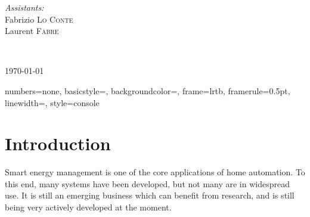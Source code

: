 \begin{titlepage}
\begin{center}
\begin{minipage}{0.4\textwidth}
\begin{flushright}
        \emph{Assistants:} \\
        Fabrizio \textsc{Lo Conte}\\
        Laurent \textsc{Fabre}\\[0.5cm]
      \end{flushright}
    \end{minipage} \\[2cm]
     
    \vfill
     
    {\large \today}
     
  \end{center}

\end{titlepage}

\newpage{}

\fancyfoot{}
\lhead{}
\cfoot{\thepage}        %
\rfoot{\today} %



\tableofcontents{}

\newpage

\lstset{language=C}



{
  numbers=none,
  basicstyle=\ttfamily\footnotesize,
  backgroundcolor=\color{grey97},
  frame=lrtb,
  framerule=0.5pt,
  linewidth=\textwidth,
}
{
  style=console
}

\lstset{
  style=console
}



\section*{Introduction}
Smart energy management is one of the core applications of home automation. To
this end, many systems have been developed, but not many are in widespread use.
It is still an emerging business which can benefit from research, and is still
being very actively developed at the moment.

